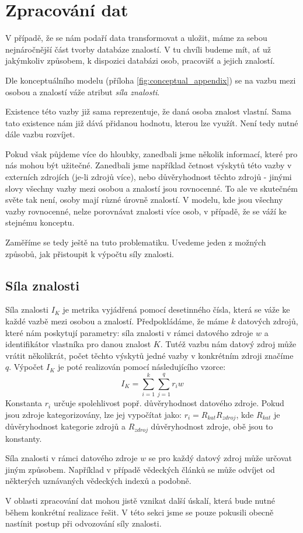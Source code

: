 \section{Zpracování dat}
V případě, že se nám podaří data transformovat a uložit, máme za sebou nejnáročnější část tvorby databáze znalostí. V tu chvíli budeme mít, ať už jakýmkoliv způsobem, k dispozici databázi osob, pracovišť a jejich znalostí.\par
Dle konceptuálního modelu (příloha \ref{fig:conceptual_appendix}) se na vazbu mezi osobou a znalostí váže atribut \textit{síla znalosti}.\par 
Existence této vazby již sama reprezentuje, že daná osoba znalost vlastní. 
Sama tato existence nám již dává přidanou hodnotu, kterou lze využít. Není tedy nutné dále vazbu rozvíjet.\par
Pokud však půjdeme více do hloubky, zanedbali jsme několik informací, které pro nás mohou být užitečné. Zanedbali jsme například četnost výskytů této vazby v externích zdrojích (je-li zdrojů více), nebo důvěryhodnost těchto zdrojů - jinými slovy všechny vazby mezi osobou a znalostí jsou rovnocenné. To ale ve skutečném světe tak není, osoby mají různé úrovně znalostí. V modelu, kde jsou všechny vazby rovnocenné, nelze porovnávat znalosti více osob, v případě, že se váží ke stejnému konceptu.\par
Zaměříme se tedy ještě na tuto problematiku. Uvedeme jeden z možných způsobů, jak přistoupit k výpočtu síly znalosti.\par
\subsection{Síla znalosti}
Síla znalosti $I_K$ je metrika vyjádřená pomocí desetinného čísla, která se váže ke každé vazbě mezi osobou a znalostí. Předpokládáme, že máme $k$ datových zdrojů, které nám poskytují parametry: síla znalosti v rámci datového zdroje $w$ a identifikátor vlastníka pro danou znalost $K$. Tutéž vazbu nám datový zdroj může vrátit několikrát, počet těchto výskytů jedné vazby v konkrétním zdroji značíme $q$. Výpočet $I_K$ je poté realizován pomocí následujícího vzorce:
$$I_K=\sum_{i=1}^{k}\sum_{j=1}^{q}r_i w$$
Konstanta $r_i$  určuje spolehlivost popř. důvěryhodnost datového zdroje. Pokud jsou zdroje kategorizovány, lze jej vypočítat jako: $r_i=R_{kat} R_{zdroj}$, kde $R_{kat}$ je důvěryhodnost kategorie zdrojů a $R_{zdroj}$ důvěryhodnost zdroje, obě jsou to konstanty.\par
Síla znalosti v rámci datového zdroje $w$ se pro každý datový zdroj může určovat jiným způsobem. Například v případě vědeckých článků se může odvíjet od některých uznávaných vědeckých indexů a podobně.\par
V oblasti zpracování dat mohou jistě vznikat další úskalí, která bude nutné během konkrétní realizace řešit. V této sekci jsme se pouze pokusili obecně nastínit postup při odvozování síly znalosti.

